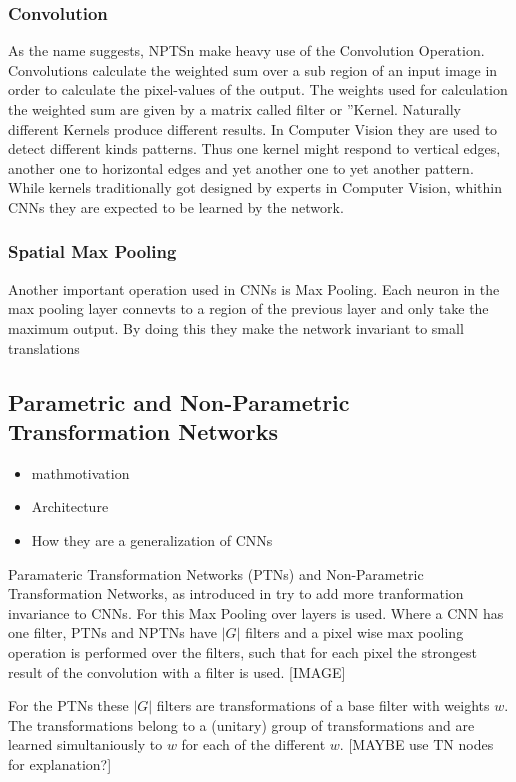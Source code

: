 \documentclass{llncs}
\begin{document}
\subsubsection{Convolution}
As the name suggests, NPTSn make heavy use of the Convolution Operation. Convolutions calculate the weighted sum over a sub region of an input image in order to calculate the pixel-values of the output. The weights used for calculation the weighted sum are given by a matrix called filter or ”Kernel. Naturally different Kernels produce different results. In Computer Vision they are used to detect different kinds patterns. Thus one kernel might respond to vertical edges, another  one to horizontal edges and yet another one to yet another pattern. While kernels traditionally got designed by experts in Computer Vision, whithin CNNs they are expected to be learned by the network.
\subsubsection{Spatial Max Pooling}
Another important operation used in CNNs is Max Pooling.
Each neuron in the max pooling layer connevts to a region of the previous
layer and only take the maximum output. By doing this they make the network
invariant to small translations

\subsection{Parametric and Non-Parametric Transformation Networks}
\begin{itemize}
  \item	mathmotivation
  \item Architecture
  \item How they are a generalization of CNNs
\end{itemize}

Paramateric Transformation Networks (PTNs) and Non-Parametric Transformation Networks, as introduced in \cite{NPTN} try to add more tranformation invariance to CNNs. For this Max Pooling over layers is used. 
Where a CNN has one filter, PTNs and NPTNs have $|G|$ filters and a pixel wise max pooling operation is performed over the filters, such that for each pixel the strongest result of the convolution with a filter is used. [IMAGE]

For the PTNs these $|G|$ filters are transformations of a base filter with weights $w$. The transformations belong to a (unitary) group of transformations and are learned simultaniously to $w$ for each of the different $w$. [MAYBE use TN nodes for explanation?]
\end{document}
